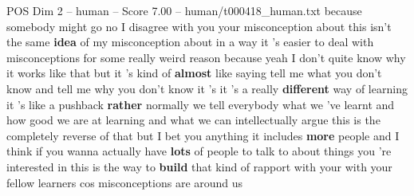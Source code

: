 \begin{textsample}{POS Dim 2 – human – Score 7.00 – human/t000418\_human.txt}  \label{ex:f2_pos_031}
because somebody might go no I disagree with you your misconception about this isn't the same \textbf{idea} of my misconception about in a way it 's easier to deal with misconceptions for some really weird reason because yeah I don't quite know why it works like that but it 's kind of \textbf{almost} like saying tell me what you don't know and tell me why you don't know it 's it 's a really \textbf{different} way of learning it 's like a pushback \textbf{rather} normally we tell everybody what we 've learnt and how good we are at learning and what we can intellectually argue this is the completely reverse of that but I bet you anything it includes \textbf{more} people and I think if you wanna actually have \textbf{lots} of people to talk to about things you 're interested in this is the way to \textbf{build} that kind of rapport with your with your fellow learners cos misconceptions are around us

\end{textsample}
